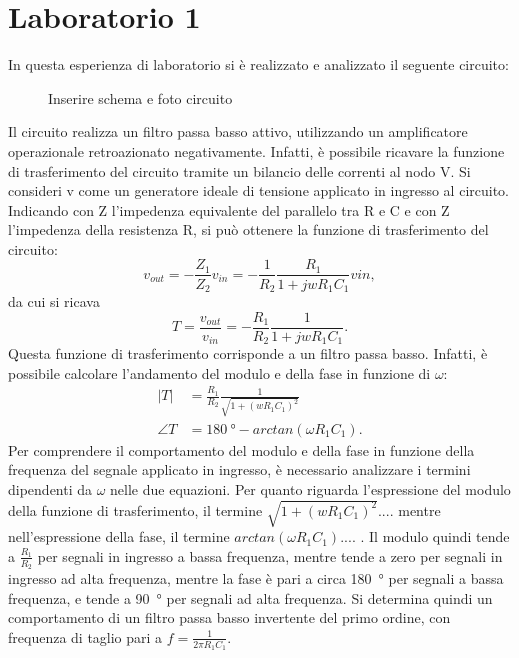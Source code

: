 \chapter{Laboratorio 1}
In questa esperienza di laboratorio si è realizzato e analizzato il seguente circuito:
\begin{figure}[h!]
	\centering
	\caption{Inserire schema e foto circuito}
	\label{fig:circuito}
\end{figure}

Il circuito realizza un filtro passa basso attivo, utilizzando un amplificatore operazionale retroazionato negativamente. Infatti, è possibile ricavare la funzione di trasferimento del circuito tramite un bilancio delle correnti al nodo V\super{-}. Si consideri v come un generatore ideale di tensione applicato in ingresso al circuito. Indicando con Z l'impedenza equivalente del parallelo tra R e C e con Z l'impedenza della resistenza R, si può ottenere la funzione di trasferimento del circuito:
\begin{equation}
	v_{out}=-\frac{Z_1}{Z_2}v_{in}=-\frac{1}{R_2}\frac{R_1}{1+j w R_1 C_1} vin,
\end{equation}
da cui si ricava
\begin{equation}
	T=\frac{v_{out}}{v_{in}}=-\frac{R_1}{R_2}\frac{1}{1+j w R_1 C_1}.
\end{equation}
Questa funzione di trasferimento corrisponde a un filtro passa basso. Infatti, è possibile calcolare l'andamento del modulo e della fase in funzione di $\omega$:
\begin{equation}
	\begin{split}
		|T|&=\frac{R_1}{R_2}\frac{1}{\sqrt{1+(wR_1C_1)^2}} \\
		\angle T&=\SI{180}{\degree}-arctan(\omega R_1 C_1).
	\end{split}
\end{equation}
Per comprendere il comportamento del modulo e della fase in funzione della frequenza del segnale applicato in ingresso, è necessario analizzare i termini dipendenti da $\omega$ nelle due equazioni. Per quanto riguarda l'espressione del modulo della funzione di trasferimento, il termine $\sqrt{1+(wR_1C_1)^2}.... $  mentre nell'espressione della fase, il termine $arctan(\omega R_1 C_1)....$ . Il modulo quindi tende a $\frac{R_1}{R_2}$ per segnali in ingresso a bassa frequenza, mentre tende a zero per segnali in ingresso ad alta frequenza, mentre la fase è pari a circa \SI{180}{\degree} per segnali a bassa frequenza, e tende a \SI{90}{\degree} per segnali ad alta frequenza.
Si determina quindi un comportamento di un filtro passa basso invertente del primo ordine, con frequenza di taglio pari a $f=\frac{1}{2\pi R_1C_1}$.

